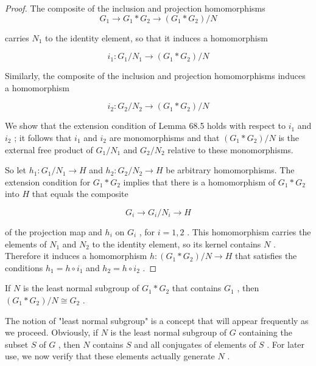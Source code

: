 \begin{proof}The composite of the inclusion and projection homomorphisms
\[
{G}_{1} \rightarrow  {G}_{1} * {G}_{2} \rightarrow  \left( {{G}_{1} * {G}_{2}}\right) /N
\]

carries \({N}_{1}\) to the identity element, so that it induces a homomorphism

\[
{i}_{1} : {G}_{1}/{N}_{1} \rightarrow  \left( {{G}_{1} * {G}_{2}}\right) /N
\]

Similarly, the composite of the inclusion and projection homomorphisms induces a homomorphism

\[
{i}_{2} : {G}_{2}/{N}_{2} \rightarrow  \left( {{G}_{1} * {G}_{2}}\right) /N
\]

We show that the extension condition of Lemma 68.5 holds with respect to \({i}_{1}\) and \({i}_{2}\) ; it follows that \({i}_{1}\) and \({i}_{2}\) are monomorphisms and that \(\left( {{G}_{1} * {G}_{2}}\right) /N\) is the external free product of \({G}_{1}/{N}_{1}\) and \({G}_{2}/{N}_{2}\) relative to these monomorphisms.

So let \({h}_{1} : {G}_{1}/{N}_{1} \rightarrow  H\) and \({h}_{2} : {G}_{2}/{N}_{2} \rightarrow  H\) be arbitrary homomorphisms. The extension condition for \({G}_{1} * {G}_{2}\) implies that there is a homomorphism of \({G}_{1} * {G}_{2}\) into \(H\) that equals the composite

\[
{G}_{i} \rightarrow  {G}_{i}/{N}_{i} \rightarrow  H
\]

of the projection map and \({h}_{i}\) on \({G}_{i}\) , for \(i = 1,2\) . This homomorphism carries the elements of \({N}_{1}\) and \({N}_{2}\) to the identity element, so its kernel contains \(N\) . Therefore it induces a homomorphism \(h : \left( {{G}_{1} * {G}_{2}}\right) /N \rightarrow  H\) that satisfies the conditions \({h}_{1} = h \circ  {i}_{1}\) and \({h}_{2} = h \circ  {i}_{2}\) .
\end{proof}
\begin{corollary} If \(N\) is the least normal subgroup of \({G}_{1} * {G}_{2}\) that contains \({G}_{1}\) , then \(\left( {{G}_{1} * {G}_{2}}\right) /N \cong  {G}_{2}\) .
\end{corollary}

The notion of "least normal subgroup" is a concept that will appear frequently as we proceed. Obviously, if \(N\) is the least normal subgroup of \(G\) containing the subset \(S\) of \(G\) , then \(N\) contains \(S\) and all conjugates of elements of \(S\) . For later use, we now verify that these elements actually generate \(N\) .

